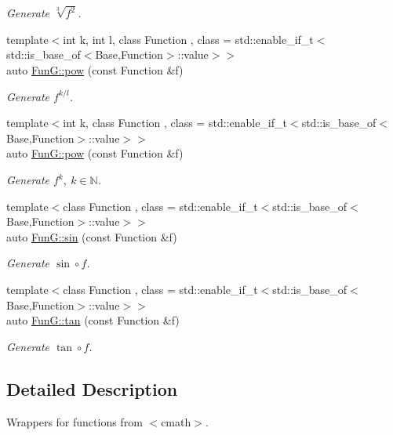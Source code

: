 \begin{DoxyCompactItemize}
\begin{DoxyCompactList}\small\item\em Generate $ \sqrt[3]{f^2}$. \end{DoxyCompactList}\item 
{\footnotesize template$<$int k, int l, class Function , class  = std\+::enable\+\_\+if\+\_\+t$<$std\+::is\+\_\+base\+\_\+of$<$\+Base,\+Function$>$\+::value$>$$>$ }\\auto \hyperlink{group__CMathGroup_gaecae6fa60bbfc0eb1867581ee4577d4e}{Fun\+G\+::pow} (const Function \&f)
\begin{DoxyCompactList}\small\item\em Generate $ f^{k/l} $. \end{DoxyCompactList}\item 
{\footnotesize template$<$int k, class Function , class  = std\+::enable\+\_\+if\+\_\+t$<$std\+::is\+\_\+base\+\_\+of$<$\+Base,\+Function$>$\+::value$>$$>$ }\\auto \hyperlink{group__CMathGroup_gab52ffe2efd379aad7ea322de46103465}{Fun\+G\+::pow} (const Function \&f)
\begin{DoxyCompactList}\small\item\em Generate $ f^k,\ k\in\mathbb{N}$. \end{DoxyCompactList}\item 
{\footnotesize template$<$class Function , class  = std\+::enable\+\_\+if\+\_\+t$<$std\+::is\+\_\+base\+\_\+of$<$\+Base,\+Function$>$\+::value$>$$>$ }\\auto \hyperlink{group__CMathGroup_ga663fdbe7a8977cba529c7c33981b7738}{Fun\+G\+::sin} (const Function \&f)
\begin{DoxyCompactList}\small\item\em Generate $ \sin\circ f $. \end{DoxyCompactList}\item 
{\footnotesize template$<$class Function , class  = std\+::enable\+\_\+if\+\_\+t$<$std\+::is\+\_\+base\+\_\+of$<$\+Base,\+Function$>$\+::value$>$$>$ }\\auto \hyperlink{group__CMathGroup_gae03f57bd4efb4449ad1dc60cb74c742d}{Fun\+G\+::tan} (const Function \&f)
\begin{DoxyCompactList}\small\item\em Generate $ \tan\circ f $. \end{DoxyCompactList}\end{DoxyCompactItemize}


\subsection{Detailed Description}
Wrappers for functions from $<$cmath$>$. 



